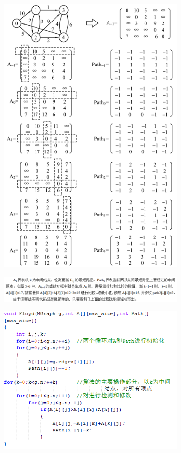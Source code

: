 {\textbf{\includegraphics[width=3.70833in,height=5.61458in]{png-jpeg-pics/FCB984767E7C573FB82B60E31CC8018E.png}\\
}}

{\textbf{\includegraphics[width=3.70833in,height=0.54167in]{png-jpeg-pics/7B265A48E834B4FFEE752E6EDF63F26C.png}\\
}}

{\textbf{\includegraphics[width=3.70833in,height=2.94792in]{png-jpeg-pics/E05C0079C0652F8DAB296970044FA836.png}\\
}}
